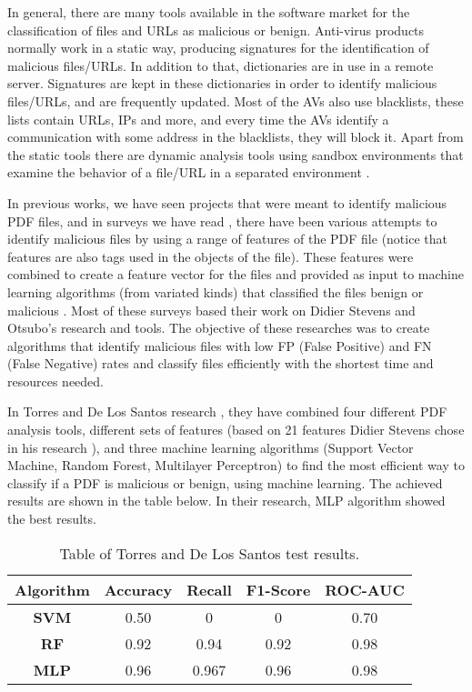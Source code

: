 \documentclass{article}
\begin{document}
\indent In general, there are many tools available in the software market for the classification of files and URLs as malicious or benign. Anti-virus products normally work in a static way, producing signatures for the identification of malicious files/URLs. In addition to that, dictionaries are in use in a remote server. Signatures are kept in these dictionaries in order to identify malicious files/URLs, and are frequently updated. Most of the AVs also use blacklists, these lists contain URLs, IPs and more, and every time the AVs identify a communication with some address in the blacklists, they will block it. Apart from the static tools there are dynamic analysis tools using sandbox environments that examine the behavior of a file/URL in a separated environment \cite{patil2018malicious}. 

\indent In previous works, we have seen projects that were meant to identify malicious PDF files, and in surveys we have read \cite{BGU2014survey} \cite{Baldoni2018survey}, there have been various attempts to identify malicious files by using a range of features of the PDF file (notice that features are also tags used in the objects of the file). These features were combined to create a feature vector for the files and provided as input to machine learning algorithms (from variated kinds) that classified the files benign or malicious \cite{torres2018malicious} \cite{Bonan2018ML}. Most of these surveys based their work on Didier Stevens \cite{1}  and Otsubo's \cite{OtsuboChecker} research and tools. The objective of these researches was to create algorithms that identify malicious files with low FP (False Positive) and FN (False Negative) rates and classify files efficiently with the shortest time and resources needed.

\indent In Torres and De Los Santos research \cite{torres2018malicious}, they have combined four different PDF analysis tools, different sets of features (based on 21 features Didier Stevens chose in his research \cite{1}), and three machine learning algorithms (Support Vector Machine, Random Forest, Multilayer Perceptron) to find the most efficient way to classify if a PDF is malicious or benign, using machine learning. The achieved results are shown in the table below. In their research, MLP algorithm showed the best results.

\begin{table}[htb]
\centering
\begin{tabular}[c]{|c|c|c|c|c|}
\hline
\textbf{Algorithm} & \textbf{Accuracy} & \textbf{Recall} & \textbf{F1-Score} & \textbf{ROC-AUC}\\
\hline
\textbf{SVM} & 0.50 & 0 & 0 & 0.70\\
\hline
\textbf{RF} & 0.92 & 0.94 & 0.92 & 0.98\\
\hline
\textbf{MLP} & 0.96 & 0.967 & 0.96 & 0.98\\
\hline
\end{tabular}
\caption{Table of Torres and De Los Santos \cite{torres2018malicious} test results.}
\end{table}
\end{document}
